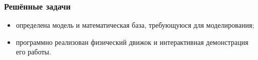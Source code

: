 \documentclass[xetex,aspectratio=43]{beamer}
\begin{document}
\begin{frame}
    \frametitle{Решённые задачи}

    \begin{itemize}
        \item определена модель и математическая база, требующуюся для моделирования;
        \item программно реализован физический движок и интерактивная демонстрация его работы.
    \end{itemize}
\end{frame}

\begin{frame}
    \titlepage
\end{frame}
\end{document}
